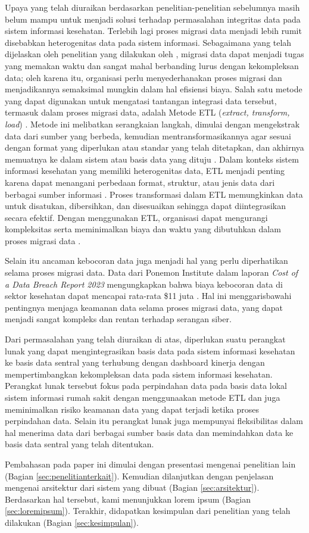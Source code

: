 Upaya yang telah diuraikan berdasarkan penelitian-penelitian sebelumnya masih belum mampu untuk menjadi solusi terhadap permasalahan integritas data pada sistem informasi kesehatan. Terlebih lagi proses migrasi data menjadi lebih rumit disebabkan heterogenitas data pada sistem informasi. Sebagaimana yang telah dijelaskan oleh penelitian yang dilakukan oleh \citet{Elamparithi2015}, migrasi data dapat menjadi tugas yang memakan waktu dan sangat mahal berbanding lurus dengan kekompleksan data; oleh karena itu, organisasi perlu menyederhanakan proses migrasi dan menjadikannya semaksimal mungkin dalam hal efisiensi biaya. Salah satu metode yang dapat digunakan untuk mengatasi tantangan integrasi data tersebut, termasuk dalam proses migrasi data, adalah Metode ETL (\emph{extract, transform, load}) \citet{Peng2023}. Metode ini melibatkan serangkaian langkah, dimulai dengan mengekstrak data dari sumber yang berbeda, kemudian mentransformasikannya agar sesuai dengan format yang diperlukan atau standar yang telah ditetapkan, dan akhirnya memuatnya ke dalam sistem atau basis data yang dituju \citet{Fana2021DataWD}. Dalam konteks sistem informasi kesehatan yang memiliki heterogenitas data, ETL menjadi penting karena dapat menangani perbedaan format, struktur, atau jenis data dari berbagai sumber informasi \citet{Peng2023}. Proses transformasi dalam ETL memungkinkan data untuk disatukan, dibersihkan, dan disesuaikan sehingga dapat diintegrasikan secara efektif. Dengan menggunakan ETL, organisasi dapat mengurangi kompleksitas serta meminimalkan biaya dan waktu yang dibutuhkan dalam proses migrasi data \citet{Fana2021DataWD}.

Selain itu ancaman kebocoran data juga menjadi hal yang perlu diperhatikan selama proses migrasi data. Data dari Ponemon Institute dalam laporan \emph{Cost of a Data Breach Report 2023} mengungkapkan bahwa biaya kebocoran data di sektor kesehatan dapat mencapai rata-rata \$11 juta \citet{Ponemon2023}. Hal ini menggarisbawahi pentingnya menjaga keamanan data selama proses migrasi data, yang dapat menjadi sangat kompleks dan rentan terhadap serangan siber.

Dari permasalahan yang telah diuraikan di atas, diperlukan suatu perangkat lunak yang dapat mengintegrasikan basis data pada sistem informasi kesehatan ke basis data sentral yang terhubung dengan dashboard kinerja dengan mempertimbangkan kekompleksan data pada sistem informasi kesehatan. Perangkat lunak tersebut fokus pada perpindahan data pada basis data lokal sistem informasi rumah sakit dengan menggunaakan metode ETL dan juga meminimalkan risiko keamanan data yang dapat terjadi ketika proses perpindahan data. Selain itu perangkat lunak juga mempunyai fleksibilitas dalam hal menerima data dari berbagai sumber basis data dan memindahkan data ke basis data sentral yang telah ditentukan.

Pembahasan pada paper ini dimulai dengan presentasi mengenai penelitian lain (Bagian \ref{sec:penelitianterkait}).
Kemudian dilanjutkan dengan penjelasan mengenai arsitektur dari sistem yang dibuat (Bagian \ref{sec:arsitektur}).
Berdasarkan hal tersebut, kami menunjukkan lorem ipsum (Bagian \ref{sec:loremipsum}).
Terakhir, didapatkan kesimpulan dari penelitian yang telah dilakukan (Bagian \ref{sec:kesimpulan}).
